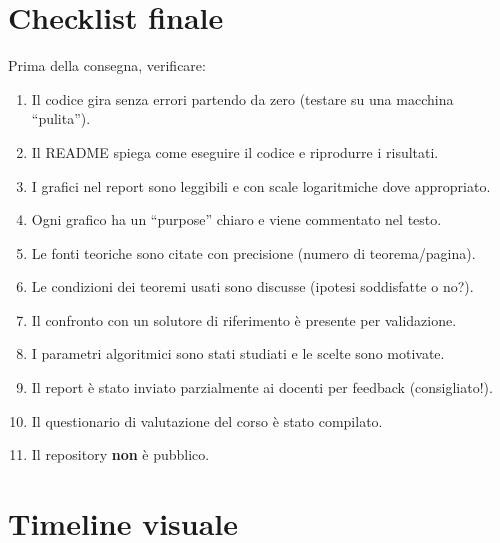 \documentclass[a4paper,11pt]{article}
\begin{document}
\section{Checklist finale}
\label{sec:checklist}

Prima della consegna, verificare:
\begin{enumerate}[label=\fbox{\phantom{X}}, leftmargin=2cm]
  \item Il codice gira senza errori partendo da zero (testare su una macchina ``pulita'').
  \item Il README spiega come eseguire il codice e riprodurre i risultati.
  \item I grafici nel report sono leggibili e con scale logaritmiche dove appropriato.
  \item Ogni grafico ha un ``purpose'' chiaro e viene commentato nel testo.
  \item Le fonti teoriche sono citate con precisione (numero di teorema/pagina).
  \item Le condizioni dei teoremi usati sono discusse (ipotesi soddisfatte o no?).
  \item Il confronto con un solutore di riferimento è presente per validazione.
  \item I parametri algoritmici sono stati studiati e le scelte sono motivate.
  \item Il report è stato inviato parzialmente ai docenti per feedback (consigliato!).
  \item Il questionario di valutazione del corso è stato compilato.
  \item Il repository \textbf{non} è pubblico.
\end{enumerate}

\section{Timeline visuale}
\label{sec:timeline}
\end{document}
